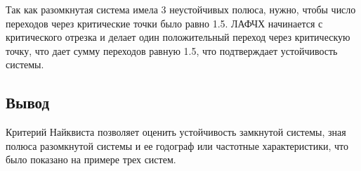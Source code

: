 Так как разомкнутая система имела 3 неустойчивых полюса, нужно, чтобы число переходов через критические точки было равно 1.5.
ЛАФЧХ начинается с критического отрезка и делает один положительный переход через критическую точку, что дает сумму переходов равную 1.5, что подтверждает устойчивость системы.

\subsection{Вывод}
Критерий Найквиста позволяет оценить устойчивость замкнутой системы, зная полюса разомкнутой системы и ее годограф 
или частотные характеристики, что было показано на примере трех систем.

\FloatBarrier